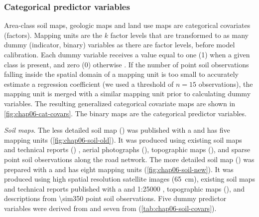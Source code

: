 \subsubsection{Categorical predictor variables}
\label{subsubsec:chap06-categorical-covars}

Area-class soil maps, geologic maps and land use maps are categorical covariates (factors). Mapping units are 
the $k$ factor levels that are transformed to as many dummy (indicator, binary) variables as there are factor 
levels, before model calibration. Each dummy variable receives a value equal to one (\num{1}) when a given 
class is present, and zero (\num{0}) otherwise \cite{Everitt2006}. If the number of point soil observations 
falling inside the spatial domain of a mapping unit is too small to accurately estimate a regression 
coefficient (we used a threshold of $n = 15$ observations), the mapping unit is merged with a similar mapping 
unit prior to calculating dummy variables. The resulting generalized categorical covariate maps are shown in 
\autoref{fig:chap06-cat-covars}. The binary maps are the categorical predictor variables.

\noindent\textit{Soil maps}. The less detailed soil map (\soilOld) was published with a  and 
has five mapping units \cite{AzolinEtAl1988} (\autoref{fig:chap06-soil-old}). It was produced using existing 
soil maps and technical reports () \cite{Brasil1973}, aerial photographs (), 
topographic maps (), and sparse point soil observations along the road network. The more detailed 
soil map (\soilNew) was prepared with a  and has eight mapping units \cite{MiguelEtAl2012} 
(\autoref{fig:chap06-soil-new}). It was produced using high spatial resolution satellite images 
(\SI{65}{\cm}), existing soil maps and technical reports published with a  \cite{Poelking2007} 
and \num{1}:\num{25000} \cite{PedronEtAl2006b}, topographic maps (), and descriptions from 
\num{\sim350} point soil observations. Five dummy predictor variables were derived from \soilOld{} and seven 
from \soilNew{} (\autoref{tab:chap06-soil-covars}).

